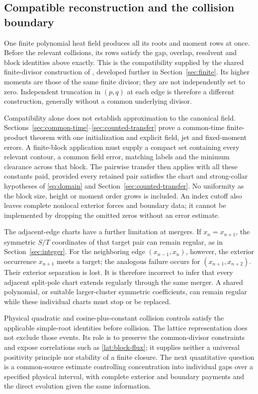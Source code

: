 \subsection{Compatible reconstruction and the collision boundary}

One finite polynomial heat field produces all its roots and moment
rows at once. Before the relevant collisions, its rows satisfy the
gap, overlap, resolvent and block identities above exactly. This is
the compatibility supplied by the shared finite-divisor construction
of \cite{BakerCM15}, developed further in Section~\ref{sec:finite}.
Its higher moments are those of the same finite divisor; they are
not independently set to zero. Independent truncation in $(p,q)$
at each edge is therefore a different construction, generally
without a common underlying divisor.

Compatibility alone does not establish approximation to the
canonical field. Sections~\ref{sec:common-time}--\ref{sec:counted-transfer}
prove a common-time finite-product theorem with one initialization and
explicit field, jet and fixed-moment errors. A finite-block application
must supply a compact set containing every relevant contour, a common
field error, matching labels and the minimum clearance across that block.
The pairwise transfer then applies with all these constants paid,
provided every retained pair satisfies the chart and strong-collar
hypotheses of \eqref{eq:domain} and Section~\ref{sec:counted-transfer}. No uniformity
as the block size, height or moment order grows is included. An
index cutoff also leaves complete nonlocal exterior forces and
boundary data; it cannot be implemented by dropping the omitted
zeros without an error estimate.

The adjacent-edge charts have a further limitation at mergers.
If $x_n=x_{n+1}$, the symmetric $S/T$ coordinates of that target
pair can remain regular, as in Section~\ref{sec:integer}. For the
neighboring edge $(x_{n-1},x_n)$, however, the exterior occurrence
$x_{n+1}$ meets a target; the analogous failure occurs for
$(x_{n+1},x_{n+2})$. Their exterior separation is lost. It is
therefore incorrect to infer that every adjacent split-pole chart
extends regularly through the same merger. A shared polynomial,
or suitable larger-cluster symmetric coefficients, can remain
regular while these individual charts must stop or be replaced.

Physical quadratic and cosine-plus-constant collision controls
satisfy the applicable simple-root identities before collision.
The lattice representation does not exclude those events. Its
role is to preserve the common-divisor constraints and expose
correlations such as \eqref{lat:block-flux}; it supplies neither
a universal positivity principle nor stability of a finite
closure. The next quantitative question is a common-source
estimate controlling concentration into individual gaps over a
specified physical interval, with complete exterior and boundary
payments and the direct evolution given the same information.
